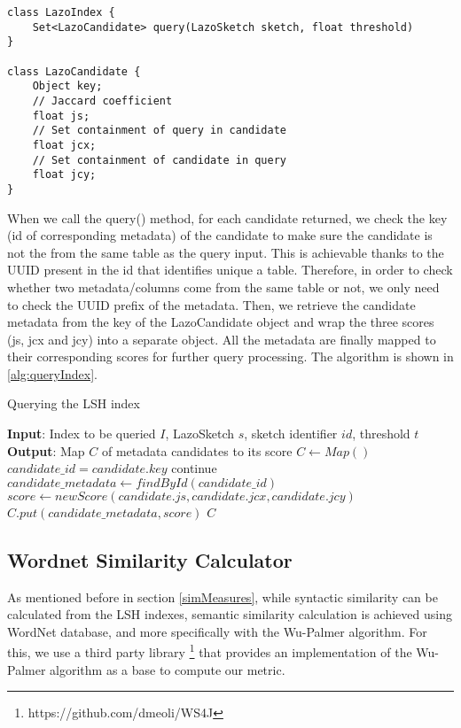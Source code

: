 \begin{lstlisting}[caption=Candidate object returned by the query() method, label=lst:queryIndex]
class LazoIndex {
    Set<LazoCandidate> query(LazoSketch sketch, float threshold)
}

class LazoCandidate {
    Object key;
    // Jaccard coefficient
    float js;
    // Set containment of query in candidate
    float jcx;
    // Set containment of candidate in query
    float jcy;
}
\end{lstlisting}

When we call the query() method, for each candidate returned, we check the key (id of corresponding metadata) of the candidate to make sure the candidate is not the from the same table as the query input. This is achievable thanks to the UUID present in the id that identifies unique a table. Therefore, in order to check whether two metadata/columns come from the same table or not, we only need to check the UUID prefix of the metadata. Then, we retrieve the candidate metadata from the key of the LazoCandidate object and wrap the three scores (js, jcx and jcy) into a separate object. All the metadata are finally mapped to their corresponding scores for further query processing. The algorithm is shown in \ref{alg:queryIndex}.

\begin{algorithm}
    \caption{Querying the LSH index}
    \label{alg:queryIndex}
    \begin{algorithmic}[1]
\STATE \textbf{Input}: Index to be queried $I$, LazoSketch $s$, sketch identifier $id$, threshold $t$
\STATE \textbf{Output}: Map $C$ of metadata candidates to its score
\STATE $C \gets Map()$
\STATE $candidate\_id = candidate.key$
\STATE continue
\ENDIF
\STATE $candidate\_metadata \gets findById(candidate\_id)$
\STATE $score \gets new Score(candidate.js, candidate.jcx, candidate.jcy)$
\STATE $C.put(candidate\_metadata, score)$
\ENDFOR
\RETURN $C$
    \end{algorithmic}
\end{algorithm}

\subsection{Wordnet Similarity Calculator}

As mentioned before in section \ref{simMeasures}, while syntactic similarity can be calculated from the LSH indexes, semantic similarity calculation is achieved using WordNet database, and more specifically with the Wu-Palmer algorithm. For this, we use a third party library \footnote{https://github.com/dmeoli/WS4J} that provides an implementation of the Wu-Palmer algorithm as a base to compute our metric.

